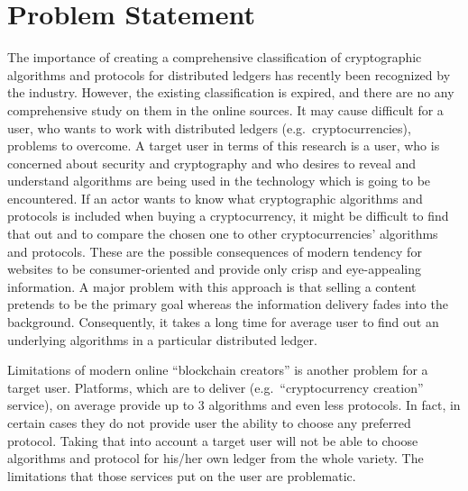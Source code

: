 \documentclass[12pt]{article}
\begin{document}
\section{Problem Statement}
The importance of creating a comprehensive classification of cryptographic
algorithms and protocols for distributed ledgers has recently been recognized
by the industry. However, the existing classification is expired, and there are
no any comprehensive study on them in the online sources. It may cause
difficult for a user, who wants to work with distributed
ledgers (e.g.\ cryptocurrencies), problems to overcome. A {target user}\label{user} in terms of this research is a
user, who is concerned about security and cryptography and who desires to
reveal and understand algorithms are being used in the technology which is going to be
encountered. If an actor
wants to know what cryptographic algorithms and protocols is included when buying a cryptocurrency, it might
be difficult to find that out and to compare the chosen one to other
cryptocurrencies' algorithms and protocols. These are the possible consequences of
modern tendency for websites to be consumer-oriented and provide only crisp and
eye-appealing information. A major problem with this approach is that selling a content pretends to be the
primary goal whereas the
information delivery fades into the background. Consequently, it takes a long time for average user to find out an
underlying algorithms in a particular distributed ledger.

Limitations of modern online ``blockchain creators'' is another problem for a
target user. Platforms, which are to deliver (e.g.\ ``cryptocurrency creation''
service), on average provide up to 3 algorithms and even less protocols. In
fact, in certain cases they do not provide user the ability to choose any preferred
protocol. Taking that into account a target user will not be able to choose
algorithms and protocol for his/her own ledger from the whole variety. The
limitations that those services put on the user are problematic.
\end{document}
